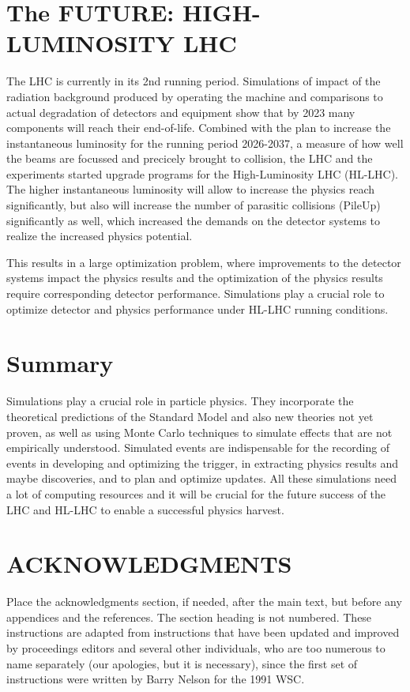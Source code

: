 \documentclass{wscpaperproc}
\theoremstyle{wsc}
\begin{document}
\section{The FUTURE: HIGH-LUMINOSITY LHC}
\label{sec:hl-lhc}

The LHC is currently in its 2nd running period. Simulations of impact of the radiation background produced by operating the machine and comparisons to actual degradation of detectors and equipment show that by 2023 many components will reach their end-of-life. Combined with the plan to increase the instantaneous luminosity for the running period 2026-2037, a measure of how well the beams are focussed and precicely brought to collision, the LHC and the experiments started upgrade programs for the High-Luminosity LHC (HL-LHC). The higher instantaneous luminosity will allow to increase the physics reach significantly, but also will increase the number of parasitic collisions (PileUp) significantly as well, which increased the demands on the detector systems to realize the increased physics potential. 

This results in a large optimization problem, where improvements to the detector systems impact the physics results and the optimization of the physics results require corresponding detector performance. Simulations play a crucial role to optimize detector and physics performance under HL-LHC running conditions. 

\section{Summary}
\label{sec:summary}

Simulations play a crucial role in particle physics. They incorporate the theoretical predictions of the Standard Model and also new theories not yet proven, as well as using Monte Carlo techniques to simulate effects that are not empirically understood. Simulated events are indispensable for the recording of events in developing and optimizing the trigger, in extracting physics results and maybe discoveries, and to plan and optimize updates. All these simulations need a lot of computing resources and it will be crucial for the future success of the LHC and HL-LHC to enable a successful physics harvest.


\section*{ACKNOWLEDGMENTS}
Place the acknowledgments section, if needed, after the main text, but before any appendices and the references. The section heading is not numbered.
These instructions are adapted from instructions that have been updated and improved by proceedings editors and several other individuals, who are too numerous to name separately (our apologies, but it is necessary), since the first set of instructions were written by Barry Nelson for the 1991 WSC.
\end{document}
